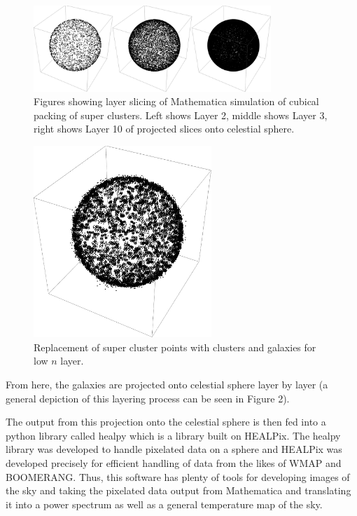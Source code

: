\documentclass[a4paper]{article}
\begin{document}
    \begin{figure}[h]
        \centering
        \includegraphics[width=0.8\textwidth]{Layers.jpg}
        \caption{Figures showing layer slicing of Mathematica simulation of
        cubical packing of super clusters. Left shows Layer 2, middle shows
        Layer 3, right shows Layer 10 of projected slices onto celestial sphere.}
    \end{figure}
    \begin{figure}[h]
        \centering
        \includegraphics[width=0.6\textwidth]{layer_cluster.jpg}
        \caption{Replacement of super cluster points with clusters and galaxies
        for low $n$ layer.}
    \end{figure}


    From here, the galaxies are projected onto celestial sphere layer by layer
    (a general depiction of this layering process can be seen in Figure 2).

    The output from this projection onto the celestial sphere is then fed into
    a python library called healpy which is a library built on HEALPix. The
    healpy library was developed to handle pixelated data on a sphere and
    HEALPix was developed precisely for efficient handling of data from the
    likes of WMAP and BOOMERANG. Thus, this software has plenty of tools for
    developing images of the sky and taking the pixelated data output from
    Mathematica and translating it into a power spectrum as well as a general
    temperature map of the sky.
\end{document}
